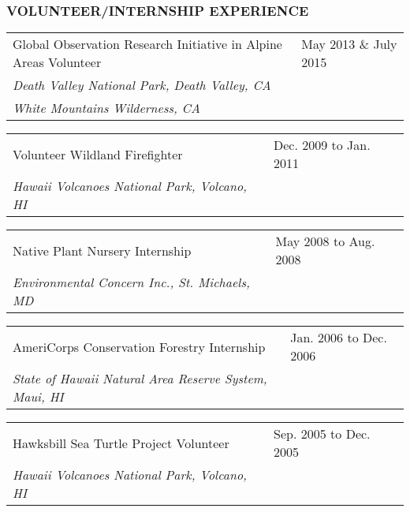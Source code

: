 \documentclass[11pt,english]{article}
\providecommand{\tabularnewline}{\\}
\begin{document}

\subsubsection*{VOLUNTEER/INTERNSHIP EXPERIENCE}
\vspace{-0.5ex}

\begin{tabular}{>{\raggedright}p{4.5in}>{\raggedleft}p{1.5in}}
Global Observation Research Initiative in Alpine Areas Volunteer & May 2013 \& July 2015\tabularnewline
\hspace{1.5em}\emph{Death Valley National Park, Death Valley, CA}\\
\hspace{1.5em}\emph{White Mountains Wilderness, CA}
\end{tabular}

\begin{tabular}{>{\raggedright}p{4in}>{\raggedleft}p{2in}}
Volunteer Wildland Firefighter & Dec. 2009 to Jan. 2011\tabularnewline
\hspace{1.5em}\emph{Hawaii Volcanoes National Park, Volcano, HI}\tabularnewline
\end{tabular}

\begin{tabular}{>{\raggedright}p{4in}>{\raggedleft}p{2in}}
Native Plant Nursery Internship & May 2008 to Aug. 2008 \tabularnewline
\hspace{1.5em}\emph{Environmental Concern Inc., St. Michaels, MD}\tabularnewline
\end{tabular}

\begin{tabular}{>{\raggedright}p{4in}>{\raggedleft}p{2in}}
AmeriCorps Conservation Forestry Internship & Jan. 2006 to Dec. 2006\tabularnewline
\hspace{1.5em}\emph{State of Hawaii Natural Area Reserve System, Maui, HI}\tabularnewline
\end{tabular}

\begin{tabular}{>{\raggedright}p{4in}>{\raggedleft}p{2in}}
Hawksbill Sea Turtle Project Volunteer & Sep. 2005 to Dec. 2005\tabularnewline
\hspace{1.5em}\emph{Hawaii Volcanoes National Park, Volcano, HI}\tabularnewline
\end{tabular}


\end{document}
